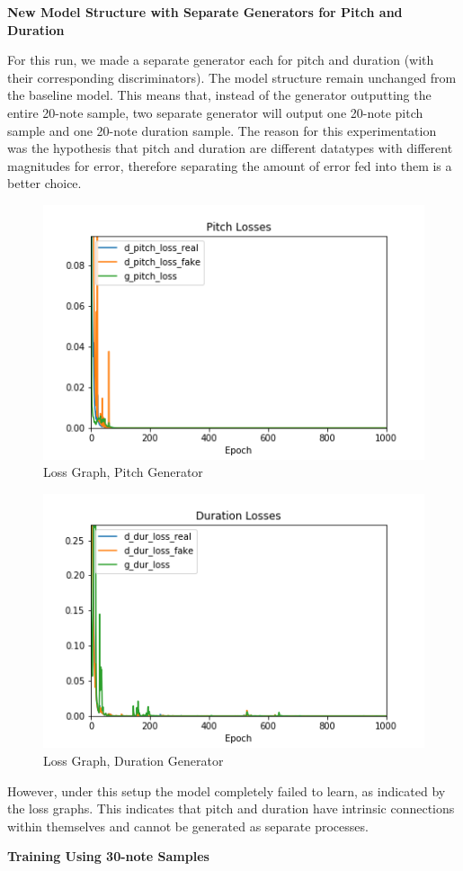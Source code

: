 \documentclass[12pt,oneside]{chicagocapstone}
\begin{document}
\textbf{New Model Structure with Separate Generators for Pitch and Duration}

For this run, we made a separate generator each for pitch and duration (with their corresponding discriminators). The model structure remain unchanged from the baseline model. This means that, instead of the generator outputting the entire 20-note sample, two separate generator will output one 20-note pitch sample and one 20-note duration sample. The reason for this experimentation was the hypothesis that pitch and duration are different datatypes with different magnitudes for error, therefore separating the amount of error fed into them is a better choice.
\begin{figure}

{\centering \includegraphics[width=0.3\linewidth]{figure/ap_newmod_pitch} 

}

\caption{Loss Graph, Pitch Generator}\label{fig:unnamed-chunk-12}
\end{figure}
\begin{figure}

{\centering \includegraphics[width=0.3\linewidth]{figure/ap_newmod_dur} 

}

\caption{Loss Graph, Duration Generator}\label{fig:unnamed-chunk-13}
\end{figure}
However, under this setup the model completely failed to learn, as indicated by the loss graphs. This indicates that pitch and duration have intrinsic connections within themselves and cannot be generated as separate processes.

\textbf{Training Using 30-note Samples}
\end{document}
